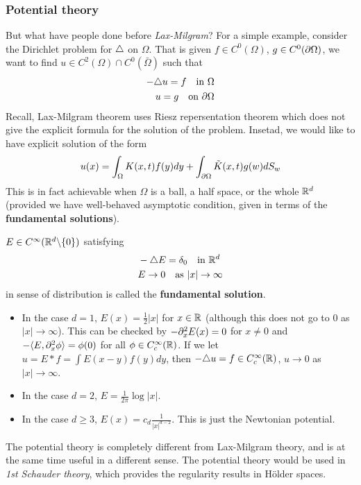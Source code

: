 \documentclass[12pt,a4paper]{article}
\begin{document}
\subsubsection*{Potential theory}

But what have people done before \emph{Lax-Milgram}? For a simple example, consider the Dirichlet problem for $\triangle$ on $\Omega$. That is given $f\in C^0(\Omega)$, $g\in C^0(\partial \Omega)$, we want to find $u\in C^2(\Omega) \cap C^0(\bar{\Omega})$ such that
\begin{align*}
-\triangle u = f \quad \text{in } \Omega \\
u =g \quad \text{on } \partial \Omega
\end{align*}
Recall, Lax-Milgram theorem uses Riesz repersentation theorem which does not give the explicit formula for the solution of the problem. Insetad, we would like to have explicit solution of the form
\begin{align*}
u(x) = \int_{\Omega} K(x,t) f(y) dy + \int_{\partial \Omega}\tilde{K}(x,t) g(w) dS_w
\end{align*}
This is in fact achievable when $\Omega$ is a ball, a half space, or the whole $\mathbb{R}^d$ (provided we have well-behaved asymptotic condition, given in terms of the \textbf{fundamental solutions}).
\s

 $E\in C^{\infty}(\mathbb{R}^d \backslash \{0\})$ satisfying
\begin{align*}
& -\triangle E = \delta_{0} \quad \text{in }\mathbb{R}^d \\
& E\rightarrow 0 \quad \text{as } |x|\rightarrow \infty 
\end{align*}
in sense of distribution is called the \textbf{fundamental solution}.
\begin{itemize}
\item In the case $d=1$, $E(x) = \frac{1}{2} |x|$ for $x\in \mathbb{R}$ (although this does not go to 0 as $|x|\rightarrow \infty$). This can be checked by $-\partial_x^2 E(x)=0$ for $x\neq 0$ and $-\langle E, \partial_x^2 \phi\rangle = \phi(0)$ for all $\phi \in C_c^{\infty}(\mathbb{R})$. If we let $u= E * f = \int E(x-y)f(y) dy$, then $-\triangle u = f \in C_c^{\infty}(\mathbb{R})$, $u\rightarrow 0$ as $|x|\rightarrow \infty$.
\item In the case $d=2$, $E=\frac{1}{2\pi} \log |x|$.
\item In the case $d\geq 3$, $E(x)= c_d \frac{1}{|x|^{d-2}}$. This is just the Newtonian potential. 
\end{itemize}
The potential theory is completely different from Lax-Milgram theory, and is at the same time useful in a different sense. The potential theory would be used in \emph{1st Schauder theory}, which provides the regularity results in H\"{o}lder spaces.
\end{document}
